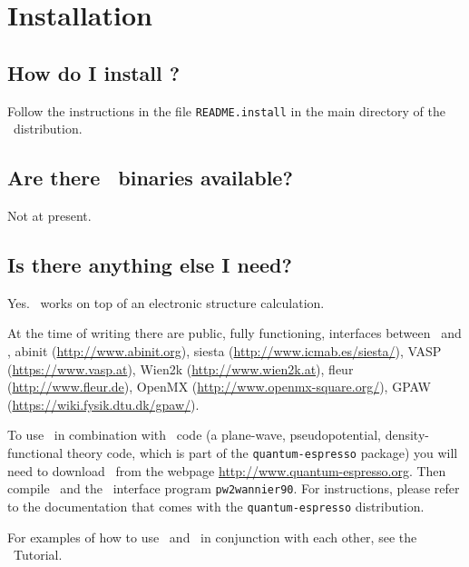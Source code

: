 \section{Installation}

\subsection{How do I install \wannier?\label{sec:installation}}

Follow the instructions in the file {\tt README.install} in the main
directory of the \wannier\ distribution.

\subsection{Are there \wannier\ binaries available?}

Not at present.

\subsection{Is there anything else I need?}

Yes. \wannier\ works on top of an electronic structure
calculation.

At the time of writing there are public, fully functioning, interfaces
between \wannier\ and \pwscf, {\sc abinit}
(\url{http://www.abinit.org}), {\sc siesta}
(\url{http://www.icmab.es/siesta/}), {\sc VASP}
(\url{https://www.vasp.at}), {\sc Wien2k} (\url{http://www.wien2k.at}),
{\sc fleur} (\url{http://www.fleur.de}), {\sc OpenMX} (\url{http://www.openmx-square.org/}),
{\sc GPAW} (\url{https://wiki.fysik.dtu.dk/gpaw/}).

To use
\wannier\ in combination with
\pwscf\ code (a plane-wave, pseudopotential, density-functional theory
code, which is part of the {\tt quantum-espresso} package) you
will need to download \pwscf\ from the webpage \url{http://www.quantum-espresso.org}. Then compile \pwscf\
and the \wannier\ interface program {\tt pw2wannier90}. For
instructions, please refer to the
documentation that comes with the {\tt quantum-espresso} distribution.

For examples of how to use \pwscf\ and \wannier\ in conjunction with
each other, see the \wannier\ Tutorial.






